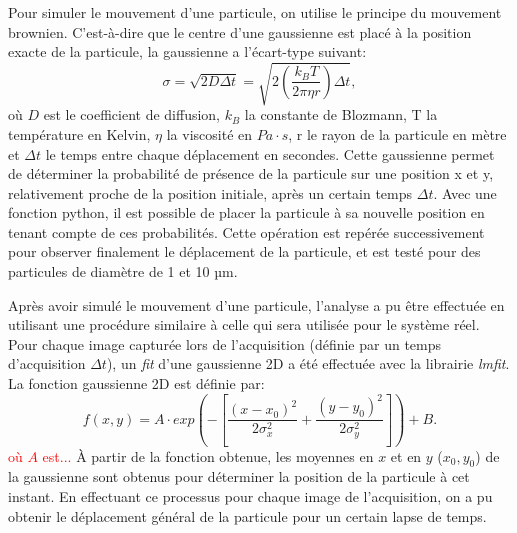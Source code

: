 \documentclass[conference]{IEEEtran}
\begin{document}
Pour simuler le mouvement d'une particule, on utilise le principe du mouvement brownien.
C'est-à-dire que le centre d'une gaussienne est placé à la position exacte de la particule,
la gaussienne a l'écart-type suivant:
\begin{equation}
  \sigma = \sqrt{2D\Delta t} = \sqrt{2\left ( \frac{k_{B}T}{2\pi \eta r} \right )\Delta t},
\end{equation}
où $D$ est le coefficient de diffusion, $k_{B}$ la constante de Blozmann, T la température en Kelvin, $\eta$ la viscosité en $Pa\cdot s$, r le rayon de la particule en mètre et $\Delta t$ le temps entre chaque déplacement en secondes. 
Cette gaussienne permet de déterminer la probabilité de présence de la particule sur une position x et y, relativement proche de la position initiale, après un certain temps $\Delta t$.  Avec une fonction python, 
il est possible de placer la particule à sa nouvelle position en tenant compte de ces probabilités. Cette opération est repérée successivement pour observer finalement 
le déplacement de la particule, et est testé pour des particules de diamètre de 1 et 10 µm.


Après avoir simulé le mouvement d'une particule, l'analyse a pu être effectuée en utilisant une procédure similaire
à celle qui sera utilisée pour le système réel. Pour chaque image capturée lors de l'acquisition (définie par un temps d'acquisition $\Delta t$), un \textit{fit}
d'une gaussienne 2D a été effectuée avec la librairie \textit{lmfit}. La fonction gaussienne 2D est définie par:
\begin{equation}
  f(x,y)=A\cdot exp\left(-\left[\frac{(x-x_0)^2}{2\sigma_x^2}+\frac{(y-y_0)^2}{2\sigma_y^2}\right]\right)+B.
\end{equation}
\textcolor{red}{où $A$ est... }À partir de la fonction obtenue, les moyennes en $x$ et en $y$ ($x_0,y_0$) de la gaussienne sont obtenus
pour déterminer la position de la particule à cet instant. En effectuant ce processus pour chaque image de l'acquisition,
on a pu obtenir le déplacement général de la particule pour un certain lapse de temps.
\end{document}
